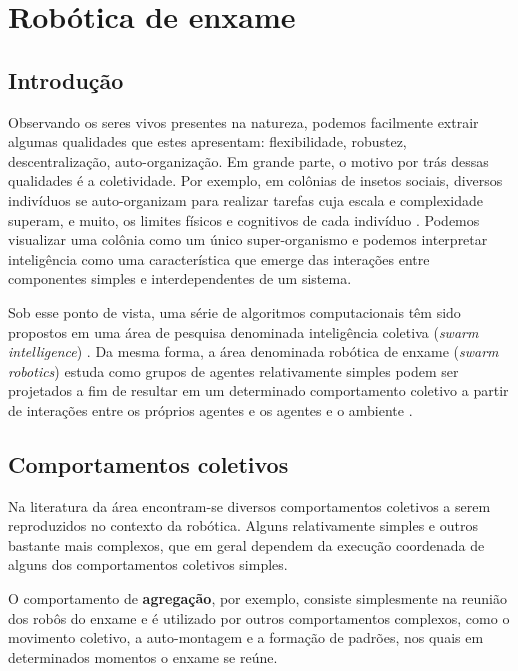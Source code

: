 \chapter{Robótica de enxame}
\label{swarm}

\section{Introdução}

Observando os seres vivos presentes na natureza, podemos facilmente extrair algumas qualidades que estes apresentam: flexibilidade, robustez, descentralização, auto-organização. Em grande parte, o motivo por trás dessas qualidades é a coletividade. Por exemplo, em colônias de insetos sociais, diversos indivíduos se auto-organizam para realizar tarefas cuja  escala e complexidade superam, e muito, os limites físicos e cognitivos de cada indivíduo \cite{navarro2012introduction}. Podemos visualizar uma colônia como um único super-organismo \cite{trianni2011swarm} e podemos interpretar inteligência como uma característica que emerge das interações entre componentes simples e interdependentes de um sistema.

Sob esse ponto de vista, uma série de algoritmos computacionais têm sido propostos em uma área de pesquisa denominada inteligência coletiva (\textit{swarm intelligence}) \cite{bonabeau1999swarm} \cite{kennedy2001swarm}. Da mesma forma, a área denominada robótica de enxame (\textit{swarm robotics}) estuda como grupos de agentes relativamente simples podem ser projetados a fim de resultar em um determinado comportamento coletivo a partir de interações entre os próprios agentes e os agentes e o ambiente \cite{sahin2005swarm}.

\section{Comportamentos coletivos}

Na literatura da área encontram-se diversos comportamentos coletivos a serem reproduzidos no contexto da robótica. Alguns relativamente simples e outros bastante mais complexos, que em geral dependem da execução coordenada de alguns dos comportamentos coletivos simples.

O comportamento de \textbf{agregação}, por exemplo, consiste simplesmente na reunião dos robôs do enxame e é utilizado por outros comportamentos complexos, como o movimento coletivo, a auto-montagem e a formação de padrões, nos quais em determinados momentos o enxame se reúne.

